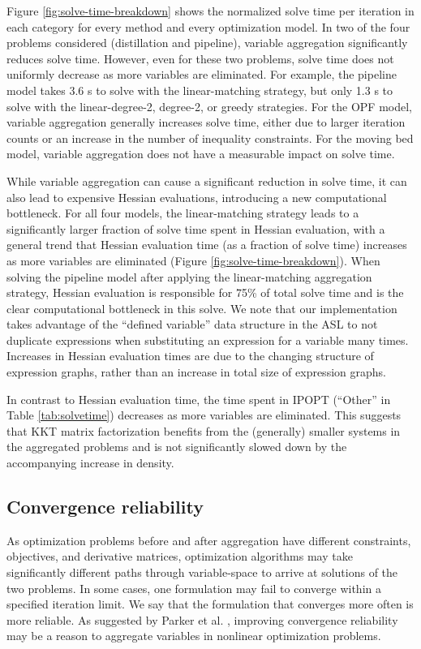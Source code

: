 \documentclass[smallextended]{svjour3}
\begin{document}
Figure \ref{fig:solve-time-breakdown} shows the normalized solve time per iteration in each category for every method and every optimization model. In two of the four problems considered (distillation and pipeline), variable
aggregation significantly reduces solve time. However, even for these two problems,
solve time does not uniformly decrease as more variables are eliminated.
For example, the pipeline model takes 3.6 s to solve with the linear-matching
strategy, but only 1.3 s to solve with the linear-degree-2, degree-2, or
greedy strategies. For the OPF model, variable aggregation generally increases
solve time, either due to larger iteration counts or an increase in the number of
inequality constraints. For the moving bed model, variable aggregation does not have
a measurable impact on solve time. 

While variable aggregation can cause a significant reduction in solve time, it can
also lead to expensive Hessian evaluations, introducing a new computational bottleneck.
For all four models, the linear-matching strategy leads to a significantly larger
fraction of solve time spent in Hessian evaluation, with a general trend that
Hessian evaluation time (as a fraction of solve time) increases as more variables
are eliminated (Figure \ref{fig:solve-time-breakdown}). When solving the pipeline model after applying the linear-matching
aggregation strategy, Hessian evaluation is responsible for 75\% of total solve time
and is the clear computational bottleneck in this solve.
We note that our implementation takes advantage of the ``defined variable'' data
structure in the ASL to not duplicate expressions when substituting an expression
for a variable many times. Increases in Hessian evaluation times are due to the
changing structure of expression graphs, rather than an increase in total size of
expression graphs.

In contrast to Hessian evaluation time, the time spent in IPOPT (``Other'' in Table
\ref{tab:solvetime}) decreases as more variables are eliminated. This suggests that
KKT matrix factorization benefits from the (generally) smaller systems in the
aggregated problems and is not significantly slowed down by the accompanying increase
in density.


\subsection{Convergence reliability}
\label{sec:convergence}
As optimization problems before and after aggregation have different constraints,
objectives, and derivative matrices, optimization algorithms may take significantly
different paths through variable-space to arrive at solutions of the two problems.
In some cases, one formulation may fail to converge within a specified iteration
limit. We say that the formulation that converges more often is more reliable.
As suggested by Parker et al. \cite{parker2022}, improving convergence reliability may
be a reason to aggregate variables in nonlinear optimization problems.
\end{document}
